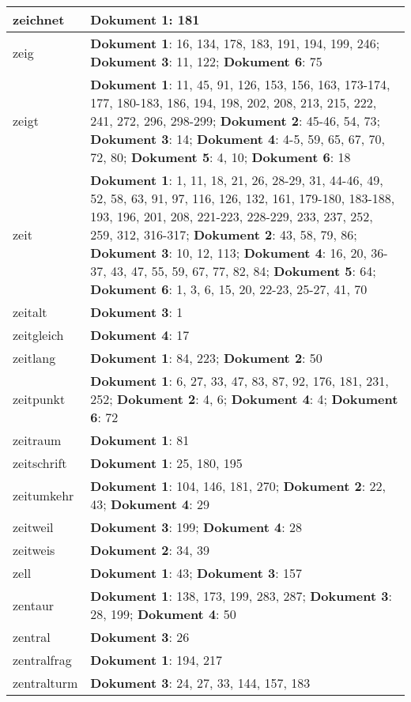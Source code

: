 \documentclass[a5paper]{article}
\begin{document}
\begin{longtable}[l]{|l|p{3in}|}
\hline
zeichnet & \textbf{Dokument 1}: 181 \\
\hline
zeig & \textbf{Dokument 1}: 16, 134, 178, 183, 191, 194, 199, 246; \textbf{Dokument 3}: 11, 122; \textbf{Dokument 6}: 75 \\
\hline
zeigt & \textbf{Dokument 1}: 11, 45, 91, 126, 153, 156, 163, 173-174, 177, 180-183, 186, 194, 198, 202, 208, 213, 215, 222, 241, 272, 296, 298-299; \textbf{Dokument 2}: 45-46, 54, 73; \textbf{Dokument 3}: 14; \textbf{Dokument 4}: 4-5, 59, 65, 67, 70, 72, 80; \textbf{Dokument 5}: 4, 10; \textbf{Dokument 6}: 18 \\
\hline
zeit & \textbf{Dokument 1}: 1, 11, 18, 21, 26, 28-29, 31, 44-46, 49, 52, 58, 63, 91, 97, 116, 126, 132, 161, 179-180, 183-188, 193, 196, 201, 208, 221-223, 228-229, 233, 237, 252, 259, 312, 316-317; \textbf{Dokument 2}: 43, 58, 79, 86; \textbf{Dokument 3}: 10, 12, 113; \textbf{Dokument 4}: 16, 20, 36-37, 43, 47, 55, 59, 67, 77, 82, 84; \textbf{Dokument 5}: 64; \textbf{Dokument 6}: 1, 3, 6, 15, 20, 22-23, 25-27, 41, 70 \\
\hline
zeitalt & \textbf{Dokument 3}: 1 \\
\hline
zeitgleich & \textbf{Dokument 4}: 17 \\
\hline
zeitlang & \textbf{Dokument 1}: 84, 223; \textbf{Dokument 2}: 50 \\
\hline
zeitpunkt & \textbf{Dokument 1}: 6, 27, 33, 47, 83, 87, 92, 176, 181, 231, 252; \textbf{Dokument 2}: 4, 6; \textbf{Dokument 4}: 4; \textbf{Dokument 6}: 72 \\
\hline
zeitraum & \textbf{Dokument 1}: 81 \\
\hline
zeitschrift & \textbf{Dokument 1}: 25, 180, 195 \\
\hline
zeitumkehr & \textbf{Dokument 1}: 104, 146, 181, 270; \textbf{Dokument 2}: 22, 43; \textbf{Dokument 4}: 29 \\
\hline
zeitweil & \textbf{Dokument 3}: 199; \textbf{Dokument 4}: 28 \\
\hline
zeitweis & \textbf{Dokument 2}: 34, 39 \\
\hline
zell & \textbf{Dokument 1}: 43; \textbf{Dokument 3}: 157 \\
\hline
zentaur & \textbf{Dokument 1}: 138, 173, 199, 283, 287; \textbf{Dokument 3}: 28, 199; \textbf{Dokument 4}: 50 \\
\hline
zentral & \textbf{Dokument 3}: 26 \\
\hline
zentralfrag & \textbf{Dokument 1}: 194, 217 \\
\hline
zentralturm & \textbf{Dokument 3}: 24, 27, 33, 144, 157, 183 \\

\end{longtable}
\end{document}
